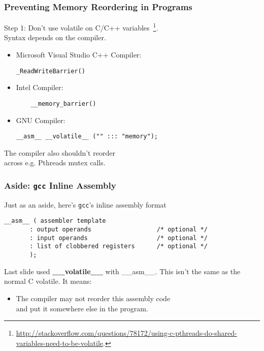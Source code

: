 \documentclass[aspectratio=43]{beamer}
\newenvironment{changemargin}[1]{%
  \begin{list}{}{%
    \setlength{\topsep}{0pt}%
    \setlength{\leftmargin}{#1}%
    \setlength{\rightmargin}{1em}
    \setlength{\listparindent}{\parindent}%
    \setlength{\itemindent}{\parindent}%
    \setlength{\parsep}{\parskip}%
  }%
  \item[]}{\end{list}}
\begin{document}
\begin{frame}[fragile]
  \frametitle{Preventing Memory Reordering in Programs}

  \begin{changemargin}{1.5cm}
     Step 1: Don't use volatile on C/C++ variables~\footnote{\tiny \url{http://stackoverflow.com/questions/78172/using-c-pthreads-do-shared-variables-need-to-be-volatile}.}.\\[1em]
     Syntax depends on the compiler.\\

\begin{itemize}
  \item Microsoft Visual Studio C++ Compiler:
  \begin{lstlisting}
_ReadWriteBarrier()
  \end{lstlisting}
  \item Intel Compiler:
  \begin{lstlisting}
    __memory_barrier()
  \end{lstlisting}
  \item GNU Compiler:
  \begin{lstlisting}
__asm__ __volatile__ ("" ::: "memory");
  \end{lstlisting}
\end{itemize}

  The compiler also shouldn't reorder\\ across e.g. Pthreads mutex calls.
  \end{changemargin}
\end{frame}

\begin{frame}[fragile]
  \frametitle{Aside: {\tt gcc} Inline Assembly}

  \begin{changemargin}{1.5cm}

  Just as an aside, here's {\tt gcc}'s inline assembly format

  \begin{lstlisting}
__asm__ ( assembler template 
       : output operands                  /* optional */
       : input operands                   /* optional */
       : list of clobbered registers      /* optional */
       );
  \end{lstlisting}
  \vfill
  Last slide used {\bf \_\_volatile\_\_} with  \_\_asm\_\_. This isn't the same as the normal C volatile. It means:

  \begin{itemize}
    \item The compiler may not reorder this assembly code\\ and put it somewhere
      else in the program.
  \end{itemize}
  \end{changemargin}

\end{frame}
\end{document}
